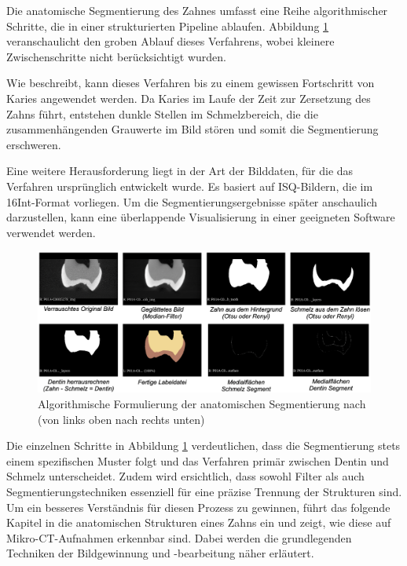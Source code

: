 Die anatomische Segmentierung des Zahnes umfasst eine Reihe algorithmischer
Schritte, die in einer strukturierten Pipeline ablaufen. Abbildung
\ref{fig:anatomische_segmentierung} veranschaulicht den groben Ablauf dieses
Verfahrens, wobei kleinere Zwischenschritte nicht berücksichtigt wurden.

Wie \citet[S.~55]{hoffmann2020} beschreibt, kann dieses Verfahren bis zu einem gewissen
Fortschritt von Karies angewendet werden. Da Karies im Laufe der Zeit zur
Zersetzung des Zahns führt, entstehen dunkle Stellen im Schmelzbereich, die die
zusammenhängenden Grauwerte im Bild stören und somit die Segmentierung
erschweren.

Eine weitere Herausforderung liegt in der Art der Bilddaten, für die das Verfahren
ursprünglich entwickelt wurde. Es basiert auf \ac{ISQ}-Bildern, die im \ac{16Int}-Format
vorliegen. Um die Segmentierungsergebnisse später anschaulich darzustellen, kann
eine überlappende Visualisierung in einer geeigneten Software verwendet werden.

\begin{figure}[h]
	\centering
	\includegraphics[width=1\textwidth]{img/anatomischeSegmentierung.png}
	\caption{Algorithmische Formulierung der anatomischen Segmentierung nach
	\citet{hoffmann2020} (von links oben nach rechts unten)}
	\label{fig:anatomische_segmentierung}
\end{figure}

Die einzelnen Schritte in Abbildung \ref{fig:anatomische_segmentierung}
verdeutlichen, dass die Segmentierung stets einem spezifischen Muster folgt und das
Verfahren primär zwischen Dentin und Schmelz unterscheidet. Zudem wird
ersichtlich, dass sowohl Filter als auch Segmentierungstechniken essenziell für eine
präzise Trennung der Strukturen sind. Um ein besseres Verständnis für diesen
Prozess zu gewinnen, führt das folgende Kapitel in die anatomischen Strukturen eines
Zahns ein und zeigt, wie diese auf Mikro-\ac{CT}-Aufnahmen erkennbar sind. Dabei
werden die grundlegenden Techniken der Bildgewinnung und -bearbeitung näher erläutert.

